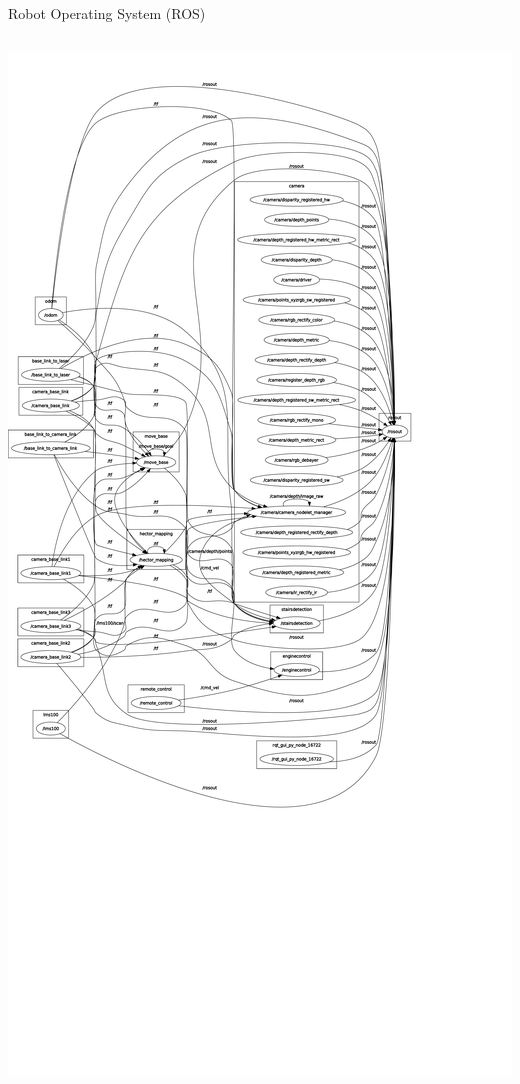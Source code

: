 \documentclass[18pt]{beamer}
\begin{document}
\begin{frame}{Robot Operating System (ROS)}
\begin{columns}
		\includegraphics[scale=0.04]{images/rosgraph_hmmwv.pdf}
\end{columns}
\end{frame}
\end{document}
